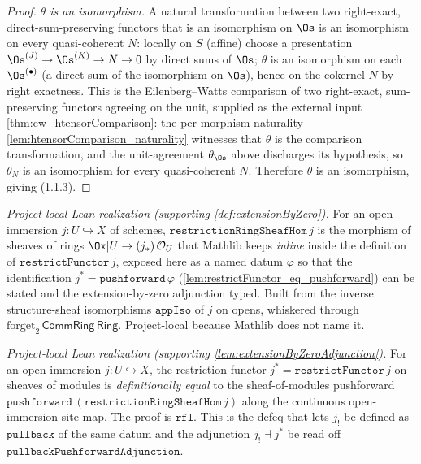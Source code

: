 \begin{lemma}
\begin{proof}
    \emph{$\theta$ is an isomorphism.} A natural transformation between two right-exact,
    direct-sum-preserving functors that is an isomorphism on $\Os$ is an isomorphism on every
    quasi-coherent $N$: locally on $S$ (affine) choose a presentation
    $\Os^{(J)} \to \Os^{(K)} \to N \to 0$ by direct sums of $\Os$; $\theta$ is an isomorphism on
    each $\Os^{(\bullet)}$ (a direct sum of the isomorphism on $\Os$), hence on the cokernel $N$
    by right exactness. This is the Eilenberg--Watts comparison of two right-exact, sum-preserving
    functors agreeing on the unit, supplied as the external input \cref{thm:ew_htensorComparison}:
    the per-morphism naturality \cref{lem:htensorComparison_naturality} witnesses that $\theta$ is
    the comparison transformation, and the unit-agreement $\theta_{\Os}$ above discharges its
    hypothesis, so $\theta_N$ is an isomorphism for every quasi-coherent $N$. Therefore $\theta$ is
    an isomorphism, giving \textnormal{(1.1.3)}.
  \end{proof}
\end{lemma}

\begin{definition}
  \label{def:restrictionRingSheafHom}
  \textit{Project-local Lean realization (supporting \cref{def:extensionByZero}).}
  For an open immersion $j : U \hookrightarrow X$ of schemes,
  $\mathtt{restrictionRingSheafHom}\,j$ is the morphism of sheaves of rings
  $\Ox|U \to (j_*)\,\mathcal{O}_U$ that Mathlib keeps \emph{inline} inside the
  definition of $\mathtt{restrictFunctor}\,j$, exposed here as a named datum
  $\varphi$ so that the identification $j^{*} = \mathtt{pushforward}\,\varphi$
  (\cref{lem:restrictFunctor_eq_pushforward}) can be stated and the
  extension-by-zero adjunction typed. Built from the inverse structure-sheaf
  isomorphisms $\mathtt{appIso}$ of $j$ on opens, whiskered through
  $\mathrm{forget}_2\,\mathsf{CommRing}\,\mathsf{Ring}$. Project-local because
  Mathlib does not name it.
\end{definition}

\begin{lemma}
  \label{lem:restrictFunctor_eq_pushforward}
  \textit{Project-local Lean realization (supporting \cref{lem:extensionByZeroAdjunction}).}
  For an open immersion $j : U \hookrightarrow X$, the restriction functor
  $j^{*} = \mathtt{restrictFunctor}\,j$ on sheaves of modules is
  \emph{definitionally equal} to the sheaf-of-modules pushforward
  $\mathtt{pushforward}\,(\mathtt{restrictionRingSheafHom}\,j)$ along the
  continuous open-immersion site map. The proof is $\mathtt{rfl}$. This is the
  defeq that lets $j_!$ be defined as $\mathtt{pullback}$ of the same datum and
  the adjunction $j_! \dashv j^{*}$ be read off
  $\mathtt{pullbackPushforwardAdjunction}$.
\end{lemma}

